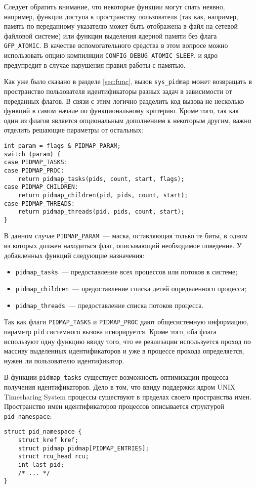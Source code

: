Следует обратить внимание, что некоторые функции могут спать неявно, например,
функции доступа к пространству пользователя (так как, например, память по
переданному указателю может быть отображена в файл на сетевой файловой системе)
или функции выделения ядерной памяти без флага \texttt{GFP\_ATOMIC}. В качестве
вспомогательного средства в этом вопросе можно использовать опцию компиляции
\texttt{CONFIG\_DEBUG\_ATOMIC\_SLEEP}, и ядро предупредит в случае нарушения
правил работы с памятью.


Как уже было сказано в разделе \ref{sec:func}, вызов \texttt{sys\_pidmap} может
возвращать в пространство пользователя идентификаторы разных задач в зависимости
от переданных флагов. В связи с этим логично разделить код вызова не несколько
функций в самом начале по функциональному критерию. Кроме того, так как один из
флагов является опциональным дополнением к некоторым другим, важно отделить
решающие параметры от остальных:
\medskip
\begin{lstlisting}[style=cstyle]
int param = flags & PIDMAP_PARAM;
switch (param) {
case PIDMAP_TASKS:
case PIDMAP_PROC:
	return pidmap_tasks(pids, count, start, flags);
case PIDMAP_CHILDREN:
	return pidmap_children(pid, pids, count, start);
case PIDMAP_THREADS:
	return pidmap_threads(pid, pids, count, start);
}
\end{lstlisting}
\medskip

В данном случае \texttt{PIDMAP\_PARAM}~--- маска, оставляющая только те биты, в
одном из которых должен находиться флаг, описывающий необходимое поведение. У
добавленных функций следующие назначения:
\begin{itemize}
\item \texttt{pidmap\_tasks}~--- предоставление всех процессов или потоков в системе;
\item \texttt{pidmap\_children}~--- предоставление списка детей определенного процесса;
\item \texttt{pidmap\_threads}~--- предоставление списка потоков процесса.
\end{itemize}

Так как флаги \texttt{PIDMAP\_TASKS} и \texttt{PIDMAP\_PROC} дают общесистемную
информацию, параметр \texttt{pid} системного вызова игнорируется. Кроме того,
оба флага используют одну функцию ввиду того, что ее реализации используется
проход по массиву выделенных идентификаторов и уже в процессе прохода
определяется, нужен ли пользователю идентификатор.

В функции \texttt{pidmap\_tasks} существует возможность оптимизации процесса
получения идентификаторов. Дело в том, что ввиду поддержки ядром UNIX
Timesharing System процессы существуют в пределах своего пространства имен.
Пространство имен идентификаторов процессов описывается структурой
\texttt{pid\_namespace}:
\medskip
\begin{lstlisting}[style=cstyle]
struct pid_namespace {
	struct kref kref;
	struct pidmap pidmap[PIDMAP_ENTRIES];
	struct rcu_head rcu;
	int last_pid;
	/* ... */
}
\end{lstlisting}
\medskip

